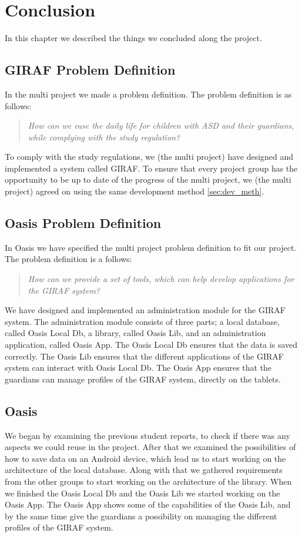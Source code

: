 \chapter{Conclusion}
In this chapter we described the things we concluded along the project. 

\section{GIRAF Problem Definition}
In the multi project we made a problem definition. The problem definition is as follows:

\begin{quotation}
\textit{How can we ease the daily life for children with ASD and their guardians, while complying with the study regulation?}
\end{quotation}

To comply with the study regulations, we (the multi project) have designed and implemented a system called GIRAF.
To ensure that every project group has the opportunity to be up to date of the progress of the multi project, we (the multi project) agreed on using the same development method \vref{sec:dev_meth}.

\section{Oasis Problem Definition}
In Oasis we have specified the multi project problem definition to fit our project. 
The problem definition is a follows:

\begin{quotation}
	\textit{How can we provide a set of tools, which can help develop applications for the GIRAF system?}
\end{quotation}

We have designed and implemented an administration module for the GIRAF system.
The administration module consists of three parts; a local database, called Oasis Local Db, a library, called Oasis Lib, and an administration application, called Oasis App.
The Oasis Local Db ensures that the data is saved correctly. The Oasis Lib ensures that the different applications of the GIRAF system can interact with Oasis Local Db. The Oasis App ensures that the guardians can manage profiles of the GIRAF system, directly on the tablets.

\section{Oasis}
We began by examining the previous student reports, to check if there was any aspects we could reuse in the project.
After that we examined the possibilities of how to save data on an Android device, which lead us to start working on the architecture of the local database.
Along with that we gathered requirements from the other groups to start working on the architecture of the library.
When we finished the Oasis Local Db and the Oasis Lib we started working on the Oasis App.
The Oasis App shows some of the capabilities of the Oasis Lib, and by the same time give the guardians a possibility on managing the different profiles of the GIRAF system.

